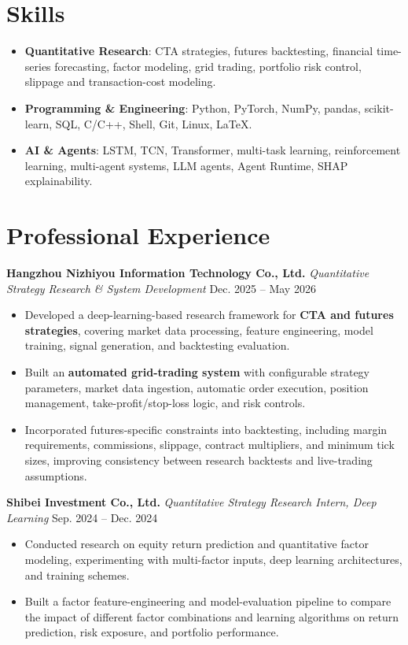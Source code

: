 \documentclass{resume}
\begin{document}
\section{\textbf{Skills}}

\begin{itemize}
  \item \textbf{Quantitative Research}: CTA strategies, futures backtesting, financial time-series forecasting, factor modeling, grid trading, portfolio risk control, slippage and transaction-cost modeling.
  \item \textbf{Programming \& Engineering}: Python, PyTorch, NumPy, pandas, scikit-learn, SQL, C/C++, Shell, Git, Linux, LaTeX.
  \item \textbf{AI \& Agents}: LSTM, TCN, Transformer, multi-task learning, reinforcement learning, multi-agent systems, LLM agents, Agent Runtime, SHAP explainability.
\end{itemize}


\section{\textbf{Professional Experience}}

\noindent
\textbf{Hangzhou Nizhiyou Information Technology Co., Ltd.} 
\textit{Quantitative Strategy Research \& System Development} \hfill Dec. 2025 -- May 2026
\begin{itemize}
  \item Developed a deep-learning-based research framework for \textbf{CTA and futures strategies}, covering market data processing, feature engineering, model training, signal generation, and backtesting evaluation.
  \item Built an \textbf{automated grid-trading system} with configurable strategy parameters, market data ingestion, automatic order execution, position management, take-profit/stop-loss logic, and risk controls.
  \item Incorporated futures-specific constraints into backtesting, including margin requirements, commissions, slippage, contract multipliers, and minimum tick sizes, improving consistency between research backtests and live-trading assumptions.
\end{itemize}

\noindent
\textbf{Shibei Investment Co., Ltd.}
\textit{Quantitative Strategy Research Intern, Deep Learning} \hfill Sep. 2024 -- Dec. 2024
\begin{itemize}
  \item Conducted research on equity return prediction and quantitative factor modeling, experimenting with multi-factor inputs, deep learning architectures, and training schemes.
  \item Built a factor feature-engineering and model-evaluation pipeline to compare the impact of different factor combinations and learning algorithms on return prediction, risk exposure, and portfolio performance.
\end{itemize}
\end{document}
